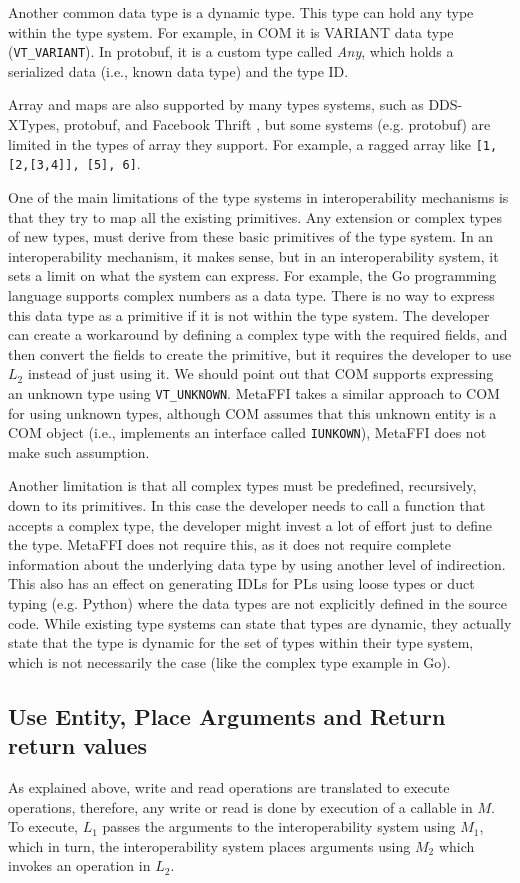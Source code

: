 \documentclass[sigplan,10pt,manuscript,nonacm]{acmart}
\begin{document}
Another common data type is a dynamic type. This type can hold any type within the type system. For example, in COM it is VARIANT data type (\texttt{VT\_VARIANT}). In protobuf, it is a custom type called \textit{Any}, which holds a serialized data (i.e., known data type) and the type ID.

Array and maps are also supported by many types systems, such as DDS-XTypes, protobuf, and Facebook Thrift \cite{thrift}, but some systems (e.g. protobuf) are limited in the types of array they support. For example, a ragged array like \texttt{[1, [2,[3,4]], [5], 6]}.

One of the main limitations of the type systems in interoperability mechanisms is that they try to map all the existing primitives. Any extension or complex types of new types, must derive from these basic primitives of the type system. In an interoperability mechanism, it makes sense, but in an interoperability system, it sets a limit on what the system can express. For example, the Go programming language supports complex numbers as a data type. There is no way to express this data type as a primitive if it is not within the type system. The developer can create a workaround by defining a complex type with the required fields, and then convert the fields to create the primitive, but it requires the developer to use $L_2$ instead of just using it. We should point out that COM supports expressing an unknown type using \texttt{VT\_UNKNOWN}. MetaFFI takes a similar approach to COM for using unknown types, although COM assumes that this unknown entity is a COM object (i.e., implements an interface called \texttt{IUNKOWN}), MetaFFI does not make such assumption.

Another limitation is that all complex types must be predefined, recursively, down to its primitives. In this case the developer needs to call a function that accepts a complex type, the developer might invest a lot of effort just to define the type. MetaFFI does not require this, as it does not require complete information about the underlying data type by using another level of indirection. This also has an effect on generating IDLs for PLs using loose types or duct typing (e.g. Python) where the data types are not explicitly defined in the source code. While existing type systems can state that types are dynamic, they actually state that the type is dynamic for the set of types within their type system, which is not necessarily the case (like the complex type example in Go).

\subsection{Use Entity, Place Arguments and Return return values}
As explained above, write and read operations are translated to execute operations, therefore, any write or read is done by execution of a callable in $M$. To execute, $L_1$ passes the arguments to the interoperability system using $M_1$, which in turn, the interoperability system places arguments using $M_2$ which invokes an operation in $L_2$.
\end{document}
